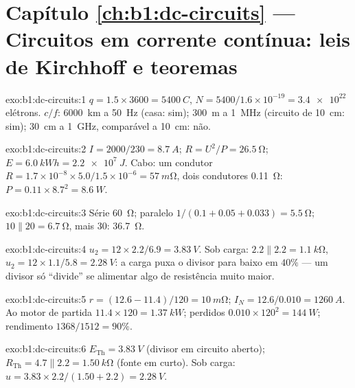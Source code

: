 \section*{Capítulo \ref{ch:b1:dc-circuits} --- Circuitos em corrente contínua: leis de Kirchhoff e teoremas}

\begin{solution}{exo:b1:dc-circuits:1}
$q = 1.5 \times 3600 = \qty{5400}{C}$, $N = 5400/1.6\times10^{-19} =
\num{3.4e22}$ elétrons. $c/f$: \qty{6000}{km} a \qty{50}{Hz} (casa:
sim); \qty{300}{m} a \qty{1}{MHz} (circuito de \qty{10}{cm}: sim);
\qty{30}{cm} a \qty{1}{GHz}, comparável a \qty{10}{cm}: não.
\end{solution}

\begin{solution}{exo:b1:dc-circuits:2}
$I = 2000/230 = \qty{8.7}{A}$; $R = U^2/P = \qty{26.5}{\ohm}$; $E =
\qty{6.0}{kWh} = \qty{2.2e7}{J}$. Cabo: um condutor $R = 1.7\times10^{-8}
\times 5.0/1.5\times10^{-6} = \qty{57}{m\ohm}$, dois condutores
\qty{0.11}{\ohm}: $P = 0.11 \times 8.7^2 = \qty{8.6}{W}$.
\end{solution}

\begin{solution}{exo:b1:dc-circuits:3}
Série \qty{60}{\ohm}; paralelo $1/(0.1 + 0.05 + 0.033) = \qty{5.5}{\ohm}$;
$10 \parallel 20 = \qty{6.7}{\ohm}$, mais $30$: \qty{36.7}{\ohm}.
\end{solution}

\begin{solution}{exo:b1:dc-circuits:4}
$u_2 = 12 \times 2.2/6.9 = \qty{3.83}{V}$. Sob carga: $2.2 \parallel 2.2 =
\qty{1.1}{k\ohm}$, $u_2 = 12 \times 1.1/5.8 = \qty{2.28}{V}$: a carga
puxa o divisor para baixo em $40\%$ --- um divisor só ``divide'' se
alimentar algo de resistência muito maior.
\end{solution}

\begin{solution}{exo:b1:dc-circuits:5}
$r = (12.6 - 11.4)/120 = \qty{10}{m\ohm}$; $I_N = 12.6/0.010 =
\qty{1260}{A}$. Ao motor de partida $11.4 \times 120 = \qty{1.37}{kW}$; perdidos
$0.010 \times 120^2 = \qty{144}{W}$; rendimento $1368/1512 = 90\%$.
\end{solution}

\begin{solution}{exo:b1:dc-circuits:6}
$E_{\mathrm{Th}} = \qty{3.83}{V}$ (divisor em circuito aberto); $R_{\mathrm{Th}}
= 4.7 \parallel 2.2 = \qty{1.50}{k\ohm}$ (fonte em curto). Sob carga:
$u = 3.83 \times 2.2/(1.50 + 2.2) = \qty{2.28}{V}$.
\end{solution}

